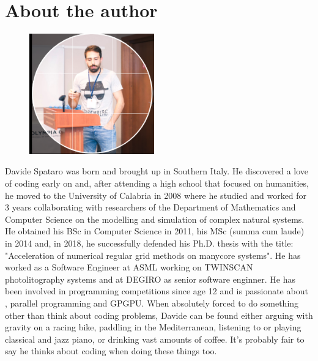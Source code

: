 \chapter*{About the author}

\begin{figure}
    \vspace{-20pt}
    \begin{center}
        \includegraphics[width=0.48\textwidth]{images/me_linkedin}
    \end{center}
    \vspace{-15pt}
  \end{figure}

Davide Spataro was born and brought up in Southern Italy. He discovered a love of coding early on and, after attending a high school that focused on humanities, he moved to the University of Calabria in 2008 where he studied and worked for 3 years collaborating with researchers of the Department of Mathematics and Computer Science on the modelling and simulation of complex natural systems. He obtained his BSc in Computer Science in 2011, his MSc (summa cum laude) in 2014 and, in 2018, he successfully defended his Ph.D. thesis with the title: "Acceleration of numerical regular grid methods on manycore systems". He has worked as a Software Engineer at ASML working on TWINSCAN photolitography systems and at DEGIRO as senior software enginner.
He has been involved in programming competitions since age 12 and is passionate about  \CC, parallel programming and GPGPU. When absolutely forced to do something other than think about coding problems, Davide can be found either arguing with gravity on a racing bike, paddling in the Mediterranean, listening to or playing classical and jazz piano, or drinking vast amounts of coffee. It's probably fair to say he thinks about coding when doing these things too. 
